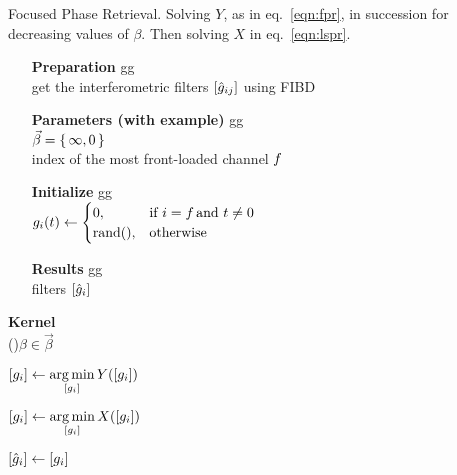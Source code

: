 
\LinesNumbered
\begin{algorithm2e} 
	\caption{Focused Phase Retrieval. Solving $Y$, as in {eq.}~\ref{eqn:fpr}, in succession for decreasing values of $\beta$.
	Then solving $X$ in {eq.}~\ref{eqn:lspr}.}
	\label{alg:fpr}
	\begin{itemize}
		\item[{\bf Preparation}]
		{\color{white} gg}\\
			get the interferometric filters $[\hat{g}_{ij}]$ using FIBD
		\item[{\bf Parameters (with example)}]
		{\color{white} gg}\\
			$\vec{\beta}=\set{\infty,0}$\\
			index of the most front-loaded channel $f$
	\item[{\bf Initialize}] 
		{\color{white} gg}\\
			$g_{i}(t)\leftarrow
			\begin{cases}
				0, &\text{if } i=f\,\text{and }t\ne0 \\
				\operatorname{rand}(), & \text{otherwise}
			\end{cases}
				$\\
		\item[{\bf Results}]
		{\color{white} gg}\\
			filters $[\hat{g}_{i}]$ \\
	\end{itemize}
	{\bf Kernel}\\
	\ForEach(){$\beta\in{\vec{\beta}}$}{

		$[{g}_i] \leftarrow  \operatorname*{arg\,min}\limits_{[g_{i}]} Y([{g}_{i}])$\\
	     }
{ 
	$[{g}_{i}] \leftarrow  \operatorname*{arg\,min}\limits_{[g_{i}]} X([g_{i}])$
	     }

	{$[\hat{g}_{i}]\leftarrow [g_{i}]$}
\end{algorithm2e} 

